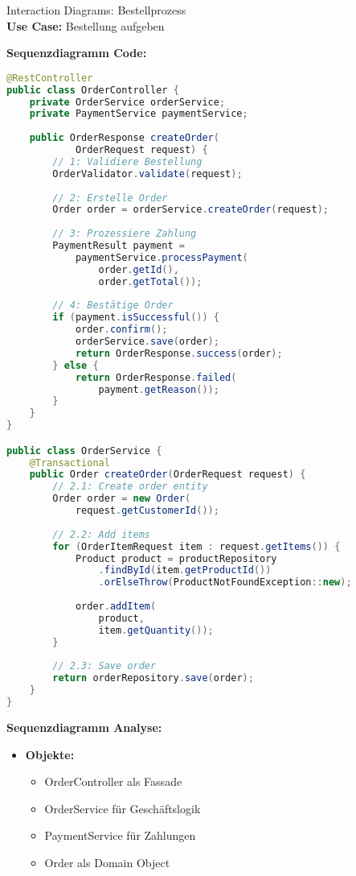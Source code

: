 \begin{example2}{Interaction Diagrams: Bestellprozess}\\
\textbf{Use Case:} Bestellung aufgeben

\textbf{Sequenzdiagramm Code:}
\begin{lstlisting}[language=Java, style=basesmol]
@RestController
public class OrderController {
    private OrderService orderService;
    private PaymentService paymentService;
    
    public OrderResponse createOrder(
            OrderRequest request) {
        // 1: Validiere Bestellung
        OrderValidator.validate(request);
        
        // 2: Erstelle Order
        Order order = orderService.createOrder(request);
        
        // 3: Prozessiere Zahlung
        PaymentResult payment = 
            paymentService.processPayment(
                order.getId(), 
                order.getTotal());
        
        // 4: Bestätige Order
        if (payment.isSuccessful()) {
            order.confirm();
            orderService.save(order);
            return OrderResponse.success(order);
        } else {
            return OrderResponse.failed(
                payment.getReason());
        }
    }
}

public class OrderService {
    @Transactional
    public Order createOrder(OrderRequest request) {
        // 2.1: Create order entity
        Order order = new Order(
            request.getCustomerId());
            
        // 2.2: Add items
        for (OrderItemRequest item : request.getItems()) {
            Product product = productRepository
                .findById(item.getProductId())
                .orElseThrow(ProductNotFoundException::new);
                
            order.addItem(
                product, 
                item.getQuantity());
        }
        
        // 2.3: Save order
        return orderRepository.save(order);
    }
}
\end{lstlisting}

\textbf{Sequenzdiagramm Analyse:}
\begin{itemize}
    \item \textbf{Objekte:}
    \begin{itemize}
        \item OrderController als Fassade
        \item OrderService für Geschäftslogik
        \item PaymentService für Zahlungen
        \item Order als Domain Object
    \end{itemize}
    

\end{itemize}
\end{example2}
